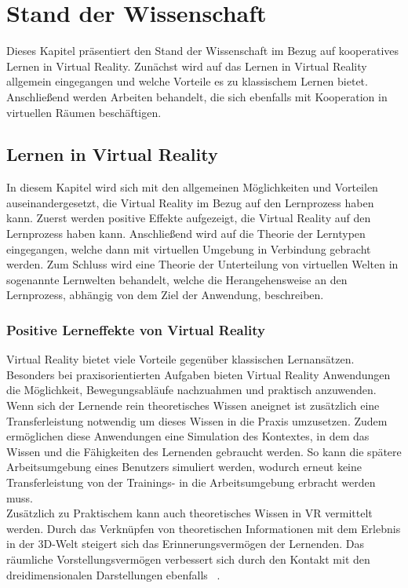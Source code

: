 \section{Stand der Wissenschaft} \label{Wissenschaft}
Dieses Kapitel präsentiert den Stand der Wissenschaft im Bezug auf kooperatives Lernen in Virtual Reality. Zunächst wird auf das Lernen in Virtual Reality allgemein eingegangen und welche Vorteile es zu klassischem Lernen bietet. Anschließend werden Arbeiten behandelt, die sich ebenfalls mit Kooperation in virtuellen Räumen beschäftigen.

\subsection{Lernen in Virtual Reality}
In diesem Kapitel wird sich mit den allgemeinen Möglichkeiten und Vorteilen auseinandergesetzt, die Virtual Reality im Bezug auf den Lernprozess haben kann. Zuerst werden positive Effekte aufgezeigt, die Virtual Reality auf den Lernprozess haben kann. Anschließend wird auf die Theorie der Lerntypen eingegangen, welche dann mit virtuellen Umgebung in Verbindung gebracht werden. Zum Schluss wird eine Theorie der Unterteilung von virtuellen Welten in sogenannte Lernwelten behandelt, welche die Herangehensweise an den Lernprozess, abhängig von dem Ziel der Anwendung, beschreiben.

\subsubsection{Positive Lerneffekte von Virtual Reality}
Virtual Reality bietet viele Vorteile gegenüber klassischen Lernansätzen. Besonders bei praxisorientierten Aufgaben bieten Virtual Reality Anwendungen die Möglichkeit, Bewegungsabläufe nachzuahmen und praktisch anzuwenden. Wenn sich der Lernende rein theoretisches Wissen aneignet ist zusätzlich eine Transferleistung notwendig um dieses Wissen in die Praxis umzusetzen. Zudem ermöglichen diese Anwendungen eine Simulation des Kontextes, in dem das Wissen und die Fähigkeiten des Lernenden gebraucht werden. So kann die spätere Arbeitsumgebung eines Benutzers simuliert werden, wodurch erneut keine Transferleistung von der Trainings- in die Arbeitsumgebung erbracht werden muss.\\

Zusätzlich zu Praktischem kann auch theoretisches Wissen in VR vermittelt werden. Durch das Verknüpfen von theoretischen Informationen mit dem Erlebnis in der 3D-Welt steigert sich das Erinnerungsvermögen der Lernenden. Das räumliche Vorstellungsvermögen verbessert sich durch den Kontakt mit den dreidimensionalen Darstellungen ebenfalls ~\parencite{Buehler2020}.\\

